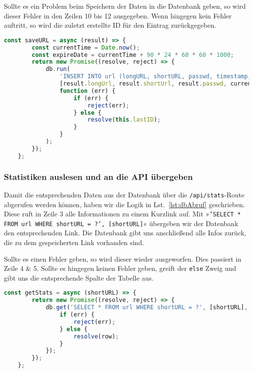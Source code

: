 \documentclass[a4paper,11pt,DIV=12]{scrreprt}%
\begin{document}
Sollte es ein Problem beim Speichern der Daten in die Datenbank geben, so wird dieser Fehler in den Zeilen 10 bis 12 ausgegeben. Wenn hingegen kein Fehler auftritt, so wird die zuletzt erstellte ID für den Eintrag zurückgegeben. 

\begin{lstlisting}[language=JavaScript,
    caption={Speichern der URL in der Datenbank},
    label={lst:dbSave},
    float=h,
    gobble=4
]
    const saveURL = async (result) => {
        const currentTime = Date.now();
        const expireDate = currentTime + 90 * 24 * 60 * 60 * 1000; 
        return new Promise((resolve, reject) => {
            db.run(
                'INSERT INTO url (longURL, shortURL, passwd, timestamp, expireDate) VALUES (?, ?, ?, ?, ?)',
                [result.longUrl, result.shortUrl, result.passwd, currentTime, expireDate],
                function (err) {
                    if (err) {
                        reject(err);
                    } else {
                        resolve(this.lastID);
                    }
                }
            );
        });
    };
\end{lstlisting}

\subsubsection{Statistiken auslesen und an die API übergeben}
Damit die entsprechenden Daten aus der Datenbank über die \texttt{/api/stats}-Route abgerufen werden können, haben wir die Logik in Lst.~\ref{lst:dbAbruf} geschrieben. 
Diese ruft in Zeile 3 alle Informationen zu einem Kurzlink auf. Mit »\texttt{'SELECT * FROM url WHERE shortURL = ?', [shortURL]}« übergeben wir der Datenbank den entsprechenden Link. Die Datenbank gibt uns anschließend alle Infos zurück, die zu dem gespeicherten Link vorhanden sind. 

Sollte es einen Fehler geben, so wird dieser wieder ausgeworfen. Dies passiert in Zeile 4 \& 5. Sollte es hingegen keinen Fehler geben, greift der \texttt{else} Zweig und gibt uns die entsprechende Spalte der Tabelle aus. 

\begin{lstlisting}[language=JavaScript,
    caption={Daten werden von der Datenbank anhand des Kurzlinks abgerufen},
    label={lst:dbAbruf},
    float=h,
    gobble=4
]
    const getStats = async (shortURL) => {
        return new Promise((resolve, reject) => {
            db.get('SELECT * FROM url WHERE shortURL = ?', [shortURL], (err, row) => {
                if (err) {
                    reject(err);
                } else {
                    resolve(row);
                }
            });
        });
    };
\end{lstlisting}
\end{document}

